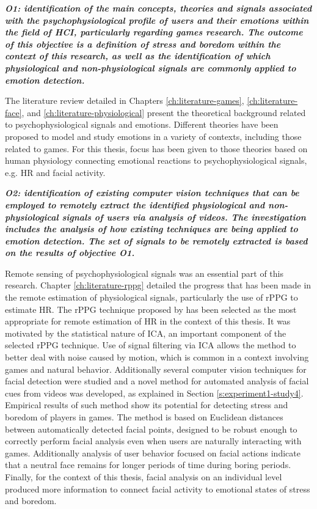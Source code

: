 \textit{\textbf{O1: identification of the main concepts, theories and signals associated with the psychophysiological profile of users and their emotions within the field of HCI, particularly regarding games research. The outcome of this objective is a definition of stress and boredom within the context of this research, as well as the identification of which physiological and non-physiological signals are commonly applied to emotion detection.}}

The literature review detailed in Chapters \ref{ch:literature-games}, \ref{ch:literature-face}, and \ref{ch:literature-physiological} present the theoretical background related to psychophysiological signals and emotions. Different theories have been proposed to model and study emotions in a variety of contexts, including those related to games. For this thesis, focus has been given to those theories based on human physiology connecting emotional reactions to psychophysiological signals, e.g. HR and facial activity.

\textit{\textbf{O2: identification of existing computer vision techniques that can be employed to remotely extract the identified physiological and non-physiological signals of users via analysis of videos. The investigation includes the analysis of how existing techniques are being applied to emotion detection. The set of signals to be remotely extracted is based on the results of objective \textbf{O1}.}}

Remote sensing of psychophysiological signals was an essential part of this research. Chapter \ref{ch:literature-rppg} detailed the progress that has been made in the remote estimation of physiological signals, particularly the use of rPPG to estimate HR. The rPPG technique proposed by \textcite{poh2011advancements} has been selected as the most appropriate for remote estimation of HR in the context of this thesis. It was motivated by the statistical nature of ICA, an important component of the selected rPPG technique. Use of signal filtering via ICA allows the method to better deal with noise caused by motion, which is common in a context involving games and natural behavior. Additionally several computer vision techniques for facial detection were studied and a novel method for automated analysis of facial cues from videos was developed, as explained in Section \ref{s:experiment1-study4}. Empirical results of such method show its potential for detecting stress and boredom of players in games. The method is based on Euclidean distances between automatically detected facial points, designed to be robust enough to correctly perform facial analysis even when users are naturally interacting with games. Additionally analysis of user behavior focused on facial actions indicate that a neutral face remains for longer periods of time during boring periods. Finally, for the context of this thesis, facial analysis on an individual level produced more information to connect facial activity to emotional states of stress and boredom.

